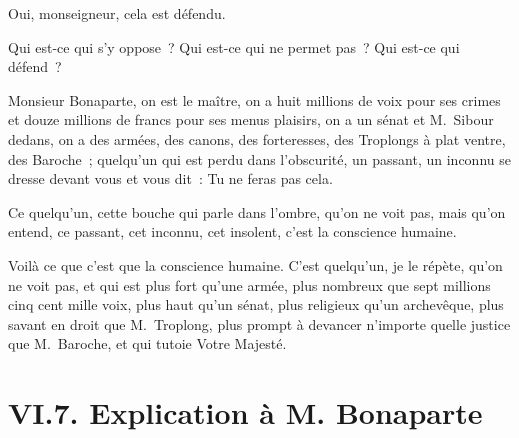 \documentclass[french,twoside]{book} %
\begin{document}
Oui, monseigneur, cela est défendu.\par
Qui est-ce qui s’y oppose ? Qui est-ce qui ne permet pas ? Qui est-ce qui défend ?\par
Monsieur Bonaparte, on est le maître, on a huit millions de voix pour ses crimes et douze millions de francs pour ses menus plaisirs, on a un sénat et M. Sibour dedans, on a des armées, des canons, des forteresses, des Troplongs à plat ventre, des Baroche ; quelqu’un qui est perdu dans l’obscurité, un passant, un inconnu se dresse devant vous et vous dit : Tu ne feras pas cela.\par
Ce quelqu’un, cette bouche qui parle dans l’ombre, qu’on ne voit pas, mais qu’on entend, ce passant, cet inconnu, cet insolent, c’est la conscience humaine.\par
Voilà ce que c’est que la conscience humaine. C’est quelqu’un, je le répète, qu’on ne voit pas, et qui est plus fort qu’une armée, plus nombreux que sept millions cinq cent mille voix, plus haut qu’un sénat, plus religieux qu’un archevêque, plus savant en droit que M. Troplong, plus prompt à devancer n’importe quelle justice que M. Baroche, et qui tutoie Votre Majesté.

\section[{VI.7. Explication à M. Bonaparte}]{VI.7. Explication à M. Bonaparte}
\end{document}
